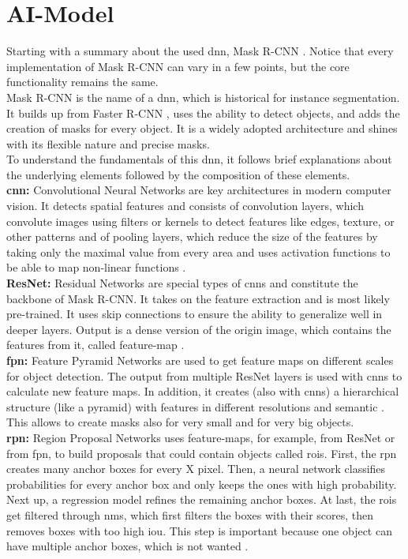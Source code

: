 	\section{AI-Model}
	\label{sec:ai-model}
		Starting with a summary about the used \ac{dnn}, Mask R-CNN \cite{Kaiming2017}. Notice that every implementation of Mask R-CNN can vary in a few points, but the core functionality remains the same.\\
		Mask R-CNN is the name of a \ac{dnn}, which is historical for instance segmentation. It builds up from Faster R-CNN \cite{Ren2016}, uses the ability to detect objects, and adds the creation of masks for every object. It is a widely adopted architecture and shines with its flexible nature and precise masks.\\
		To understand the fundamentals of this \ac{dnn}, it follows brief explanations about the underlying elements followed by the composition of these elements.\\
		\textbf{\ac{cnn}:} Convolutional Neural Networks are key architectures in modern computer vision. It detects spatial features and consists of convolution layers, which convolute images using filters or kernels to detect features like edges, texture, or other patterns and of pooling layers, which reduce the size of the features by taking only the maximal value from every area and uses activation functions to be able to map non-linear functions \cite{Oshea2015}.\\
		\textbf{ResNet:} Residual Networks are special types of \ac{cnn}s and constitute the backbone of Mask R-CNN. It takes on the feature extraction and is most likely pre-trained. It uses skip connections to ensure the ability to generalize well in deeper layers. Output is a dense version of the origin image, which contains the features from it, called feature-map \cite{He2015}.\\
		\textbf{\ac{fpn}:} Feature Pyramid Networks are used to get feature maps on different scales for object detection. The output from multiple ResNet layers is used with \ac{cnn}s to calculate new feature maps. In addition, it creates (also with \ac{cnn}s) a hierarchical structure (like a pyramid) with features in different resolutions and semantic \cite{Lin2017}. This allows to create masks also for very small and for very big objects.\\
		\textbf{\ac{rpn}:} Region Proposal Networks uses feature-maps, for example, from ResNet or from \ac{fpn}, to build proposals that could contain objects called \ac{roi}s. First, the \ac{rpn} creates many anchor boxes for every X pixel. Then, a neural network classifies probabilities for every anchor box and only keeps the ones with high probability. Next up, a regression model refines the remaining anchor boxes. At last, the \ac{roi}s get filtered through \ac{nms}, which first filters the boxes with their scores, then removes boxes with too high \ac{iou}. This step is important because one object can have multiple anchor boxes, which is not wanted \cite{Ren2016}.\\
